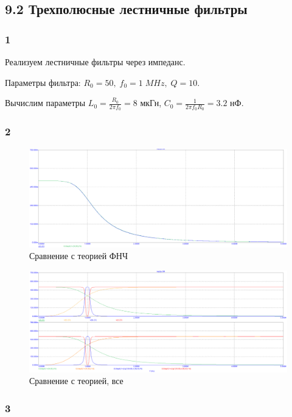 \documentclass[12pt,a4paper]{article}
\begin{document}
	\subsection*{9.2 Трехполюсные лестничные фильтры}
	
	\subsubsection*{1}
	Реализуем лестничные фильтры через импеданс.
	
	Параметры фильтра: $R_0 = 50,\; f_0 = 1 \; MHz, \; Q = 10$.
	
	Вычислим параметры $L_0 = \frac{R_0}{2 \pi f_0} = 8$ мкГн, $C_0 = \frac{1}{2 \pi f_0 R_0} = 3.2$ нФ.

	\subsubsection*{2}

	\begin{figure}[H]
		\centering
		\includegraphics[width=1.0\linewidth]{res/imp3p_th.png}
		\caption{Сравнение с теорией ФНЧ}
		\label{th}
	\end{figure}

	\begin{figure}[H]
		\centering
		\includegraphics[width=1.0\linewidth]{res/imp3p_thall.png}
		\caption{Сравнение с теорией, все}
		\label{thall}
	\end{figure}

	\subsubsection*{3}
\end{document}

